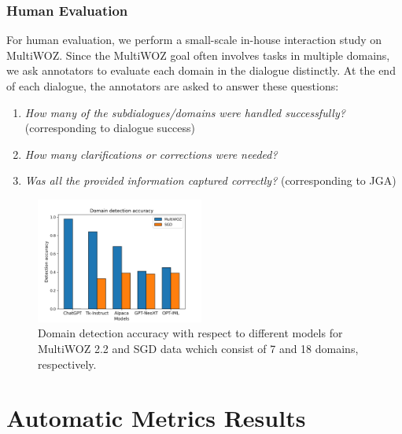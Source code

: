 \subsubsection*{Human Evaluation}
For human evaluation, we perform a small-scale in-house interaction study on MultiWOZ.
Since the MultiWOZ goal often involves tasks in multiple domains, we ask annotators to evaluate each domain in the dialogue distinctly.
At the end of each dialogue, the annotators are asked to answer these questions:
\begin{enumerate}
    \item \emph{How many of the subdialogues/domains were handled successfully?} (corresponding to dialogue success)
    \item \emph{How many clarifications or corrections were needed?}
    \item \emph{Was all the provided information captured correctly?} (corresponding to JGA)
\end{enumerate}

\begin{figure}[h]
    \centering
    \includegraphics[width=0.49\textwidth]{images/domain-detections.png}
    \caption{Domain detection accuracy with respect to different models for MultiWOZ 2.2 and SGD data wchich consist of 7 and 18 domains, respectively.}
    \label{07:fig:domains}
\end{figure}


\section{Automatic Metrics Results}
\label{sec:results}

